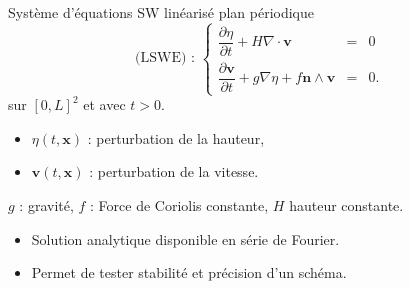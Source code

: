 \documentclass[11pt]{beamer}
\begin{document}
\begin{frame}{}
\begin{block}{Système d'équations SW linéarisé plan périodique}
\begin{equation*}
\text{(LSWE) : }\left\lbrace
\begin{array}{rcl}
\dfrac{\partial \eta}{\partial t} + H \nabla \cdot \mathbf{v} & = & 0\\
\dfrac{\partial \mathbf{v}}{\partial t} + g \nabla \eta + f \mathbf{n} \wedge \mathbf{v} & = & 0.
\end{array}
\right.
\end{equation*}
sur $[0,L]^2$ et avec $t>0$.

\begin{itemize}
\item $\eta(t,\mathbf{x})$ : perturbation de la hauteur,
\item $\mathbf{v}(t,\mathbf{x})$ : perturbation de la vitesse.
\end{itemize}

$g$ : gravité, $f$ : Force de Coriolis constante, $H$ hauteur constante.
\end{block}

\begin{itemize}
\item Solution analytique disponible en série de Fourier.
\item Permet de tester stabilité et précision d'un schéma.
\end{itemize}
\end{frame}


\end{document}
